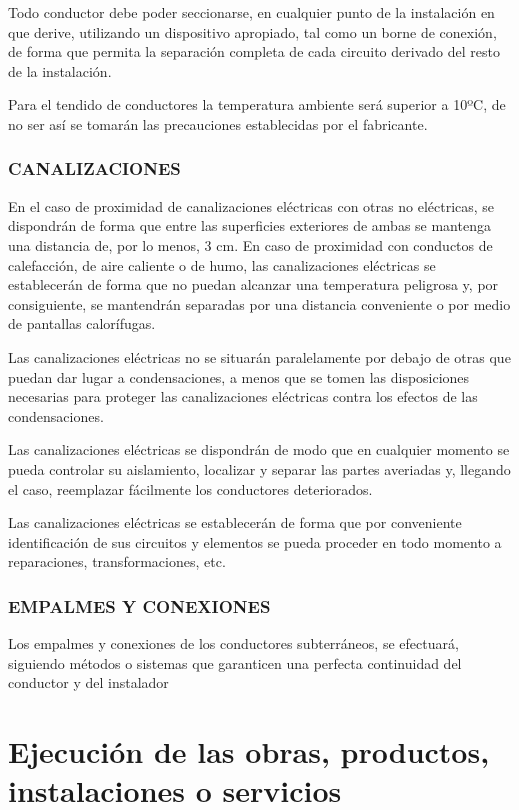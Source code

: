 \documentclass{article}
\begin{document}
Todo conductor debe poder seccionarse, en cualquier punto de la instalación en que derive, utilizando un dispositivo apropiado, tal como un borne de conexión, de forma que permita la separación completa de cada circuito derivado del resto de la instalación.

Para el tendido de conductores la temperatura ambiente será superior a 10ºC, de no ser así se tomarán las precauciones establecidas por el fabricante.

\subsubsection{ CANALIZACIONES}

En el caso de proximidad de canalizaciones eléctricas con otras no eléctricas, se dispondrán de forma que entre las superficies exteriores de ambas se mantenga una distancia de, por lo menos, 3 cm. En caso de proximidad con conductos de calefacción, de aire caliente o de humo, las canalizaciones eléctricas se establecerán de forma que no puedan alcanzar una temperatura peligrosa y, por consiguiente, se mantendrán separadas por una distancia conveniente o por medio de pantallas calorífugas.

Las canalizaciones eléctricas no se situarán paralelamente por debajo de otras que puedan dar lugar a condensaciones, a menos que se tomen las disposiciones necesarias para proteger las canalizaciones eléctricas contra los efectos de las condensaciones.

Las canalizaciones eléctricas se dispondrán de modo que en cualquier momento se pueda controlar su aislamiento, localizar y separar las partes averiadas y, llegando el caso, reemplazar fácilmente los conductores deteriorados.

Las canalizaciones eléctricas se establecerán de forma que por conveniente identificación de sus circuitos y elementos se pueda proceder en todo momento a reparaciones, transformaciones, etc.

\subsubsection{ EMPALMES Y CONEXIONES}

Los empalmes y conexiones de los conductores subterráneos, se efectuará, siguiendo métodos o sistemas que garanticen una perfecta continuidad del conductor y del  instalador

\section{ Ejecución de las obras, productos, instalaciones o servicios}
\end{document}
